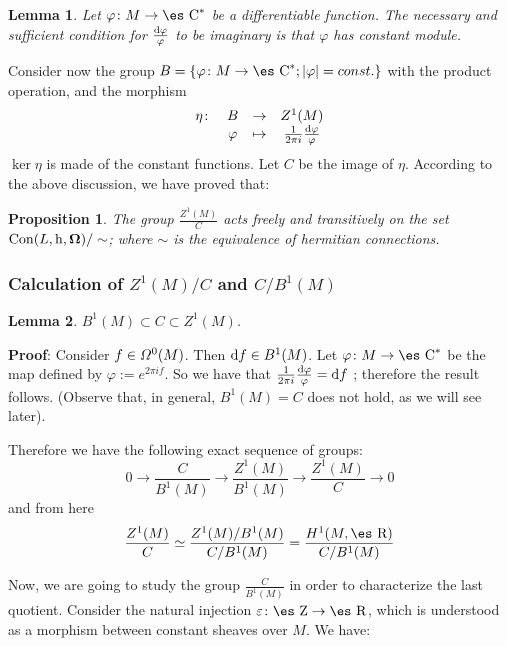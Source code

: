 \documentclass[12pt]{article}
\newtheorem{prop}{Proposition}
\newtheorem{lem}{Lemma}
\def\dst{\(}
\def\qed{\ifvmode\removelastskip\fi
{\unskip\nobreak\hfil\penalty50\hbox{}\nobreak\hfil
\hbox{\vrule height1.2ex width1.2ex}\parfillskip=0pt
\finalhyphendemerits=0 \par\smallskip}}
\def\d{{\rm d}}
\def\h{{\rm h}}
\def\curv{{\bf \Omega}}
\def\Zahl{\mbox{\es Z}}
\def\Real{\mbox{\es R}}
\def\Complex{\mbox{\es C}}
\begin{document}
\begin{lem}
Let $\varphi \colon M \to \Complex^*$ be a differentiable
function. The necessary and sufficient condition for \dst \frac{\d
\varphi}{\varphi}\) to be imaginary is that $\varphi$ has constant
module.
\end{lem}

Consider now the group
$B = \{ \varphi \colon M \to \Complex^* ; |\varphi | = const. \}$
with the product operation, and the morphism
$$
\begin{array}{cccc}
\eta \colon & B & \rightarrow & Z^1(M)
\\
& \varphi & \mapsto & \frac{1}{2\pi i}\frac{\d \varphi}{\varphi}
\end{array}
$$
$\ker \eta$ is made of the constant functions.
Let $C$ be the image of $\eta$.
According to the above discussion,
we have proved that:

\begin{prop}
The group \dst \frac{Z^1(M)}{C}\)
acts freely and transitively on the set
${\rm Con}(L,\h ,\curv )/ \sim$;
where $\sim$ is the equivalence of hermitian connections.
\end{prop}



\subsubsection{Calculation of $Z^1(M)/C$ and $C/B^1(M)$}


\begin{lem}
$B^1(M) \subset C \subset Z^1(M)$.
\end{lem}
{\bf Proof}: 
Consider $f \in {\mit\Omega}^0(M)$. Then $\d f \in B^1(M)$.
Let $\varphi \colon M \to \Complex^*$ be the map
defined by $\varphi := e^{2\pi if}$.
So we have that
\dst\frac{1}{2\pi i} \frac{\d \varphi}{\varphi} = \d f\) ;
therefore the result follows.
(Observe that, in general,
$B^1(M) =C$ does not hold, as we will see later).
\qed

Therefore we have the following exact sequence of groups:
$$
0 \to \frac{C}{B^1(M)} \to \frac{Z^1(M)}{B^1(M)}
\to \frac{Z^1(M)}{C} \to 0
$$
and from here
$$
\frac{Z^1(M)}{C} \simeq \frac{Z^1(M)/B^1(M)}{C/B^1(M)}
= \frac{H^1(M,\Real )}{C /B^1(M)}
$$

Now, we are going to study the group $\frac{C}{B^1(M)}$
in order to characterize the last quotient.
Consider the natural injection $\varepsilon \colon \Zahl \to \Real$,
which is
understood as a morphism between constant sheaves over $M$. We have:
\end{document}
